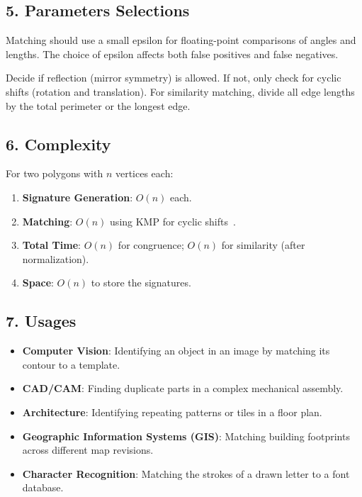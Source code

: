 \subsection{5. Parameters Selections}
\begin{definition}
\label{def:pm_precision}
Matching should use a small epsilon for floating-point comparisons of angles and lengths. The choice of epsilon affects both false positives and false negatives.
\end{definition}

\begin{definition}
\label{def:pm_transformations}
Decide if reflection (mirror symmetry) is allowed. If not, only check for cyclic shifts (rotation and translation). For similarity matching, divide all edge lengths by the total perimeter or the longest edge.
\end{definition}

\subsection{6. Complexity}
\begin{theorem}
\label{thm:pm_complexity}
For two polygons with $n$ vertices each:
\begin{enumerate}
    \item \textbf{Signature Generation}: $O(n)$ each.
    \item \textbf{Matching}: $O(n)$ using KMP for cyclic shifts~\cite{arkin1991}.
    \item \textbf{Total Time}: $O(n)$ for congruence; $O(n)$ for similarity (after normalization).
    \item \textbf{Space}: $O(n)$ to store the signatures.
\end{enumerate}
\end{theorem}

\subsection{7. Usages}
\begin{itemize}
    \item \textbf{Computer Vision}: Identifying an object in an image by matching its contour to a template.
    \item \textbf{CAD/CAM}: Finding duplicate parts in a complex mechanical assembly.
    \item \textbf{Architecture}: Identifying repeating patterns or tiles in a floor plan.
    \item \textbf{Geographic Information Systems (GIS)}: Matching building footprints across different map revisions.
    \item \textbf{Character Recognition}: Matching the strokes of a drawn letter to a font database.
\end{itemize}


